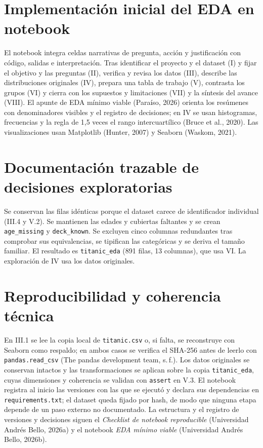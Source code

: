 \documentclass[11pt,letterpaper]{article}
\begin{document}
\section{Implementación inicial del EDA en notebook}
El notebook integra celdas narrativas de pregunta, acción y justificación con código, salidas e interpretación. Tras identificar el proyecto y el dataset (I) y fijar el objetivo y las preguntas (II), verifica y revisa los datos (III), describe las distribuciones originales (IV), prepara una tabla de trabajo (V), contrasta los grupos (VI) y cierra con los supuestos y limitaciones (VII) y la síntesis del avance (VIII). El apunte de EDA mínimo viable (Paraíso, 2026) orienta los resúmenes con denominadores visibles y el registro de decisiones; en IV se usan histogramas, frecuencias y la regla de 1,5 veces el rango intercuartílico (Bruce et al., 2020). Las visualizaciones usan Matplotlib (Hunter, 2007) y Seaborn (Waskom, 2021).

\section{Documentación trazable de decisiones exploratorias}
Se conservan las filas idénticas porque el dataset carece de identificador individual (III.4 y V.2). Se mantienen las edades y cubiertas faltantes y se crean \texttt{age\_missing} y \texttt{deck\_known}. Se excluyen cinco columnas redundantes tras comprobar sus equivalencias, se tipifican las categóricas y se deriva el tamaño familiar. El resultado es \texttt{titanic\_eda} (891 filas, 13 columnas), que usa VI. La exploración de IV usa los datos originales.

\section{Reproducibilidad y coherencia técnica}
En III.1 se lee la copia local de \texttt{titanic.csv} o, si falta, se reconstruye con Seaborn como respaldo; en ambos casos se verifica el SHA-256 antes de leerlo con \texttt{pandas.read\_csv} (The pandas development team, s.\,f.). Los datos originales se conservan intactos y las transformaciones se aplican sobre la copia \texttt{titanic\_eda}, cuyas dimensiones y coherencia se validan con \texttt{assert} en V.3. El notebook registra al inicio las versiones con las que se ejecutó y declara sus dependencias en \texttt{requirements.txt}; el dataset queda fijado por hash, de modo que ninguna etapa depende de un paso externo no documentado. La estructura y el registro de versiones y decisiones siguen el \textit{Checklist de notebook reproducible} (Universidad Andrés Bello, 2026a) y el notebook \textit{EDA mínimo viable} (Universidad Andrés Bello, 2026b).
\end{document}
